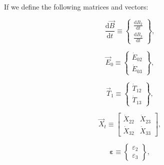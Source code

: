 \noindent{}If we define the following matrices and vectors:

\begin{equation} \label{eq:dBdt_vec_def}
	\frac{\mathrm{d}\vec{B}}{\mathrm{d}t} 
	\equiv
	\begin{Bmatrix}	
		\frac{\mathrm{d}B_{2}}{\mathrm{d}t}	\\[0.4em] %
		\frac{\mathrm{d}B_{3}}{\mathrm{d}t}
	\end{Bmatrix},
\end{equation}

\begin{equation} \label{eq:E_vec_def}
	\vec{E}_{0} 
	\equiv
	\begin{Bmatrix}
		\dot{E}_{02} \\
		\dot{E}_{03}
	\end{Bmatrix},
\end{equation} 

\begin{equation} \label{eq:T_vec_def}
	\vec{T}_{1} 
	\equiv
	\begin{Bmatrix}
		\dot{T}_{12} \\
		\dot{T}_{13}
	\end{Bmatrix},
\end{equation} 

\begin{equation} \label{eq:X_t_matrix_def}
	\vec{X}_{t} 
	\equiv
	\begin{bmatrix}
		\dot{X}_{22} & \dot{X}_{23} \\
		\dot{X}_{32} & \dot{X}_{33}
	\end{bmatrix},
\end{equation} 

\begin{equation} \label{eq:eps_vec_def}
	\bm{\varepsilon} 
	\equiv
	\begin{Bmatrix}
		\varepsilon_{2}	\\
		\varepsilon_{3}
	\end{Bmatrix},
\end{equation} 

